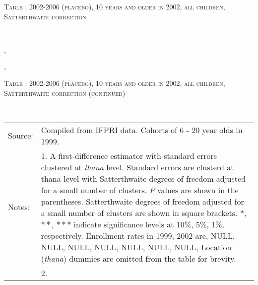 \begin{table}\hfil\textsc{\footnotesize Table \thetable:  2002-2006 (placebo), 10 years and older in 2002, all children, Satterthwaite correction\label{zEm.1999.10.sameN}}\\\setlength{\tabcolsep}{1pt}\renewcommand{\arraystretch}{.675}\hspace{-2em}\hfil{}\\\renewcommand{\arraystretch}{1}\end{table}, \addtocounter{table}{-1}, \begin{table}\hfil\textsc{\footnotesize Table \thetable:  2002-2006 (placebo), 10 years and older in 2002, all children, Satterthwaite correction (continued)\label{zEm.1999.10.sameN}}\\\setlength{\tabcolsep}{1pt}\renewcommand{\arraystretch}{.675}\hspace{-2em}\hfil{}\\\renewcommand{\arraystretch}{1}\hfil\begin{tabular}{>{\hfill\scriptsize}p{1cm}<{}>{\scriptsize}p{12cm}<{\hfill}} Source:& Compiled from IFPRI data. Cohorts of 6 - 20 year olds in 1999. \\[-1ex] Notes:& 1. A first-difference estimator with standard errors clustered at \textit{thana} level. Standard errors are clusterd at thana level with Satterthwaite degrees of freedom adjusted for a small number of clusters. $P$ values are shown in the parentheses. Satterthwaite degrees of freedom adjusted for a small number of clusters are shown in square brackets. $*$, $**$, $***$ indicate significance levels at 10\%, 5\%, 1\%, respectively. Enrollment rates in 1999, 2002 are, NULL, NULL, NULL, NULL, NULL, NULL, NULL, Location (\textit{thana}) dummies are omitted from the table for brevity. \\ & 2.   \end{tabular} \end{table}
